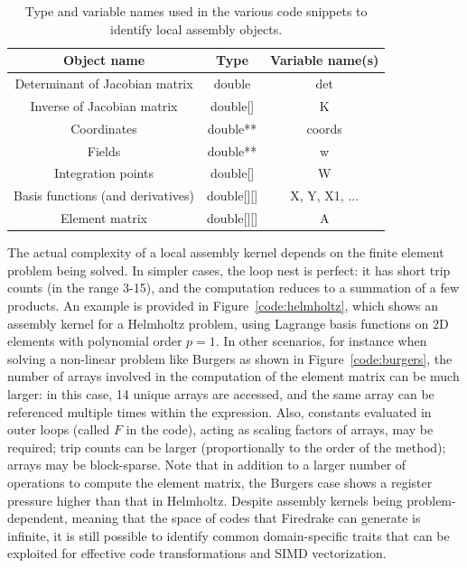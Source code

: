 \documentclass[conference]{IEEEtran}
\begin{document}
\begin{table}[h]
\begin{center}
\begin{tabulary}{1.0\columnwidth}{|C|C|C|}
\hline
Object name & Type & Variable name(s) \\\hline\hline
Determinant of Jacobian matrix & double & det  \\ \hline
Inverse of Jacobian matrix & double[] & K \\ \hline
Coordinates & double** & coords\\ \hline
Fields & double** & w \\ \hline
Integration points & double[] & W \\ \hline
Basis functions (and derivatives) & double[][] & X, Y, X1, ... \\ \hline
Element matrix & double[][] & A\\ \hline
\end{tabulary}
\end{center}
\caption{Type and variable names used in the various code snippets to identify local assembly objects.}
\label{table:map-name-letters}
\end{table}


The actual complexity of a local assembly kernel depends on the finite element problem being solved. In simpler cases, the loop nest is perfect: it has short trip counts (in the range 3-15), and the computation reduces to a summation of a few products. An example is provided in Figure~\ref{code:helmholtz}, which shows an assembly kernel for a Helmholtz problem, using Lagrange basis functions on 2D elements with polynomial order $p=1$. In other scenarios, for instance when solving a non-linear problem like Burgers as shown in Figure~\ref{code:burgers}, the number of arrays involved in the computation of the element matrix can be much larger: in this case, 14 unique arrays are accessed, and the same array can be referenced multiple times within the expression. Also, constants evaluated in outer loops (called $F$ in the code), acting as scaling factors of arrays, may be required; trip counts can be larger (proportionally to the order of the method); arrays may be block-sparse. Note that in addition to a larger number of operations to compute the element matrix, the Burgers case shows a register pressure higher than that in Helmholtz. Despite assembly kernels being problem-dependent, meaning that the space of codes that Firedrake can generate is infinite, it is still possible to identify common domain-specific traits that can be exploited for effective code transformations and SIMD vectorization.
\end{document}
